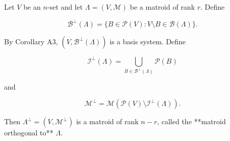 Let $V$ be an $n$-set and let $\Lambda = (V, \mathcal{M})$ be a matroid of rank $r$. Define

$$\mathcal{B}^{\perp}(\Lambda) = \{B \in \mathcal{P}(V): V \setminus B \in \mathcal{B}(\Lambda)\}.$$

By Corollary A3, $(V, \mathcal{B}^{\perp}(\Lambda))$ is a basis system. Define

$$\mathcal{I}^{\perp}(\Lambda) = \bigcup_{B \in \mathcal{B}^{\perp}(\Lambda)} \mathcal{P}(B)$$

and

$$\mathcal{M}^{\perp} = \mathcal{M}(\mathcal{P}(V) \setminus \mathcal{I}^{\perp}(\Lambda)).$$

Then $\Lambda^{\perp} = (V, \mathcal{M}^{\perp})$ is a matroid of rank $n - r$, called the **matroid orthogonal to** $\Lambda$.
